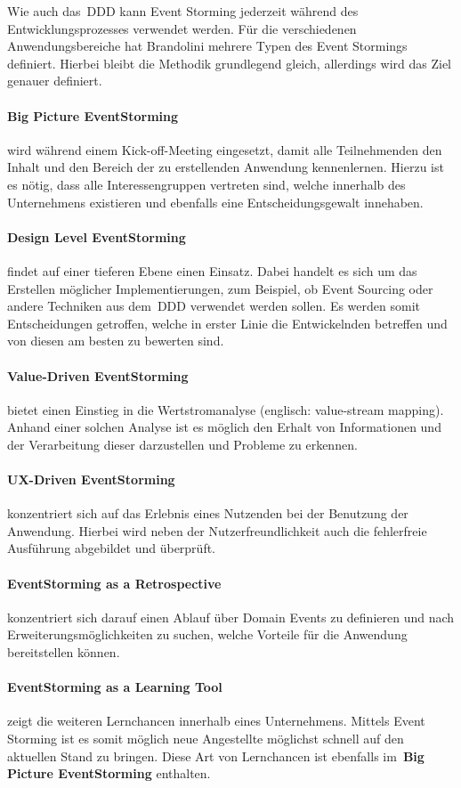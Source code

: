 Wie auch das~\ac{DDD} kann Event Storming jederzeit während des Entwicklungsprozesses verwendet werden.
Für die verschiedenen Anwendungsbereiche hat Brandolini mehrere Typen des Event Stormings definiert\cite*{introES}.
Hierbei bleibt die Methodik grundlegend gleich, allerdings wird das Ziel genauer definiert.

\paragraph*{Big Picture EventStorming} wird während einem Kick-off-Meeting eingesetzt, damit alle Teilnehmenden den Inhalt und den Bereich der zu erstellenden Anwendung kennenlernen.
Hierzu ist es nötig, dass alle Interessengruppen vertreten sind, welche innerhalb des Unternehmens existieren und ebenfalls eine Entscheidungsgewalt innehaben.
\paragraph*{Design Level EventStorming} findet auf einer tieferen Ebene einen Einsatz.
Dabei handelt es sich um das Erstellen möglicher Implementierungen, zum Beispiel, ob Event Sourcing oder andere Techniken aus dem~\ac{DDD} verwendet werden sollen.
Es werden somit Entscheidungen getroffen, welche in erster Linie die Entwickelnden betreffen und von diesen am besten zu bewerten sind.
\paragraph*{Value-Driven EventStorming} bietet einen Einstieg in die Wertstromanalyse (englisch: value-stream mapping).
Anhand einer solchen Analyse ist es möglich den Erhalt von Informationen und der Verarbeitung dieser darzustellen und Probleme zu erkennen.
\paragraph*{UX-Driven EventStorming} konzentriert sich auf das Erlebnis eines Nutzenden bei der Benutzung der Anwendung.
Hierbei wird neben der Nutzerfreundlichkeit auch die fehlerfreie Ausführung abgebildet und überprüft.
\paragraph*{EventStorming as a Retrospective} konzentriert sich darauf einen Ablauf über Domain Events zu definieren und nach
Erweiterungsmöglichkeiten zu suchen, welche Vorteile für die Anwendung bereitstellen können.
\paragraph*{EventStorming as a Learning Tool} zeigt die weiteren Lernchancen innerhalb eines Unternehmens.
Mittels Event Storming ist es somit möglich neue Angestellte möglichst schnell auf den aktuellen Stand zu bringen.
Diese Art von Lernchancen ist ebenfalls im~\textbf{Big Picture EventStorming} enthalten.

